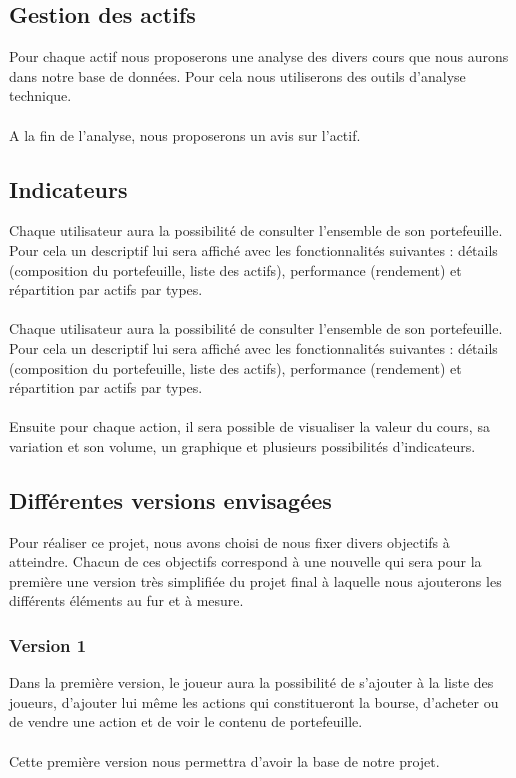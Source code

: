 \subsection{Gestion des actifs}
Pour chaque actif nous proposerons une analyse des divers cours que nous aurons dans notre base de données. Pour cela nous utiliserons des outils d’analyse technique. \\ \\
A la fin de l’analyse, nous proposerons un avis sur l’actif. 

\subsection{Indicateurs}
Chaque utilisateur aura la possibilité de consulter l’ensemble de son portefeuille. Pour cela un descriptif lui sera affiché avec les fonctionnalités suivantes : détails (composition du portefeuille, liste des actifs), performance (rendement) et répartition par actifs par types. \\ \\
Chaque utilisateur aura la possibilité de consulter l’ensemble de son portefeuille. Pour cela un descriptif lui sera affiché avec les fonctionnalités suivantes : détails (composition du portefeuille, liste des actifs), performance (rendement) et répartition par actifs par types. \\ \\
Ensuite pour chaque action, il sera possible de visualiser la valeur du cours, sa variation et son volume, un graphique et plusieurs possibilités d’indicateurs. 


\subsection{Différentes versions envisagées}
Pour réaliser ce projet, nous avons choisi de nous fixer divers objectifs à atteindre. Chacun de ces objectifs correspond à une nouvelle qui sera pour la première une version très simplifiée du projet final à laquelle nous ajouterons les différents éléments au fur et à mesure. \\ 
\subsubsection{Version 1}
Dans la première version, le joueur aura la possibilité de s'ajouter à la liste des joueurs, d'ajouter lui même les actions qui constitueront la bourse, d'acheter ou de vendre une action et de voir le contenu de portefeuille. \\ \\
Cette première version nous permettra d'avoir la base de notre projet. 

